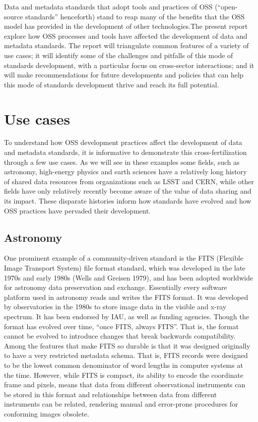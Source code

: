 \documentclass[
  letterpaper,
  DIV=11,
  numbers=noendperiod]{scrartcl}
\begin{document}
Data and metadata standards that adopt tools and practices of OSS
(``open-source standards'' henceforth) stand to reap many of the
benefits that the OSS model has provided in the development of other
technologies.The present report explore how OSS processes and tools have
affected the development of data and metadata standards. The report will
triangulate common features of a variety of use cases; it will identify
some of the challenges and pitfalls of this mode of standards
development, with a particular focus on cross-sector interactions; and
it will make recommendations for future developments and policies that
can help this mode of standards development thrive and reach its full
potential.

\section{Use cases}\label{sec-use-cases}

To understand how OSS development practices affect the development of
data and metadata standards, it is informative to demonstrate this
cross-fertilization through a few use cases. As we will see in these
examples some fields, such as astronomy, high-energy physics and earth
sciences have a relatively long history of shared data resources from
organizations such as LSST and CERN, while other fields have only
relatively recently become aware of the value of data sharing and its
impact. These disparate histories inform how standards have evolved and
how OSS practices have pervaded their development.

\subsection{Astronomy}\label{astronomy}

One prominent example of a community-driven standard is the FITS
(Flexible Image Transport System) file format standard, which was
developed in the late 1970s and early 1980s (Wells and Greisen 1979),
and has been adopted worldwide for astronomy data preservation and
exchange. Essentially every software platform used in astronomy reads
and writes the FITS format. It was developed by observatories in the
1980s to store image data in the visible and x-ray spectrum. It has been
endorsed by IAU, as well as funding agencies. Though the format has
evolved over time, ``once FITS, always FITS''. That is, the format
cannot be evolved to introduce changes that break backwards
compatibility. Among the features that make FITS so durable is that it
was designed originally to have a very restricted metadata schema. That
is, FITS records were designed to be the lowest common denominator of
word lengths in computer systems at the time. However, while FITS is
compact, its ability to encode the coordinate frame and pixels, means
that data from different observational instruments can be stored in this
format and relationships between data from different instruments can be
related, rendering manual and error-prone procedures for conforming
images obsolete.
\end{document}
